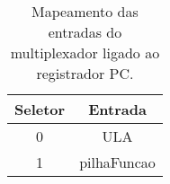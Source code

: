 
\begin{table}[]
\centering
\begin{tabular}{|c|c|}
\hline
\textbf{Seletor} & \textbf{Entrada}     \\ \hline
0       & ULA         \\ \hline
1       & pilhaFuncao \\ \hline
\end{tabular}
\caption{Mapeamento das entradas do multiplexador ligado ao registrador PC.}
\label{table_muxPc}
\end{table}